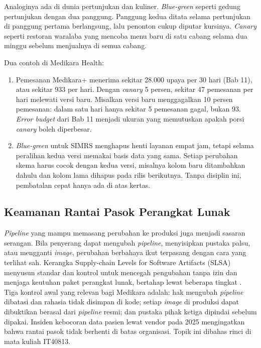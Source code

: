 Analoginya ada di dunia pertunjukan dan kuliner. \textit{Blue-green} seperti gedung pertunjukan
dengan dua panggung. Panggung kedua ditata selama pertunjukan di panggung pertama berlangsung, lalu
penonton cukup diputar kursinya. \textit{Canary} seperti restoran waralaba yang mencoba menu baru
di satu cabang selama dua minggu sebelum menjualnya di semua cabang.

Dua contoh di Medikara Health:
\begin{enumerate}
  \item Pemesanan Medikara+ menerima sekitar 28.000 upaya per 30 hari (Bab 11), atau sekitar
        933 per hari. Dengan \textit{canary} 5 persen, sekitar 47 pemesanan per hari melewati
        versi baru. Misalkan versi baru menggagalkan 10 persen pemesanan: dalam satu hari hanya
        sekitar 5 pemesanan gagal, bukan 93. \textit{Error budget} dari Bab 11 menjadi ukuran
        yang memutuskan apakah porsi \textit{canary} boleh diperbesar.
  \item \textit{Blue-green} untuk SIMRS menghapus henti layanan empat jam, tetapi selama peralihan
        kedua versi memakai basis data yang sama. Setiap perubahan skema harus cocok dengan kedua
        versi, misalnya kolom baru ditambahkan dahulu dan kolom lama dihapus pada rilis
        berikutnya. Tanpa disiplin ini, pembatalan cepat hanya ada di atas kertas.
\end{enumerate}

\subsection{Keamanan Rantai Pasok Perangkat Lunak}

\textit{Pipeline} yang mampu memasang perubahan ke produksi juga menjadi sasaran serangan. Bila
penyerang dapat mengubah \textit{pipeline}, menyisipkan pustaka palsu, atau mengganti
\textit{image}, perubahan berbahaya ikut terpasang dengan cara yang terlihat sah. Kerangka
Supply-chain Levels for Software Artifacts (SLSA) menyusun standar dan kontrol untuk mencegah
pengubahan tanpa izin dan menjaga keutuhan paket perangkat lunak, bertahap lewat beberapa tingkat
\cite{c13-slsa}. Tiga kontrol awal yang relevan bagi Medikara adalah: hak mengubah
\textit{pipeline} dibatasi dan rahasia tidak disimpan di kode; setiap \textit{image} di produksi
dapat dibuktikan berasal dari \textit{pipeline} resmi; dan pustaka pihak ketiga dipindai sebelum
dipakai. Insiden kebocoran data pasien lewat vendor pada 2025 mengingatkan bahwa rantai pasok tidak
berhenti di batas organisasi. Topik ini dibahas rinci di mata kuliah IT40813.

